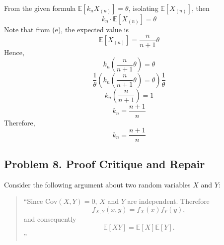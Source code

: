 \documentclass[letterpaper,12pt]{article}
\begin{document}
\begin{enumerate}[(a)]
\begin{list}{}{}
        From the given formula $\mathbb{E}[k_n X_{(n)}] = \theta$, isolating $\mathbb{E}[X_{(n)}]$, then
        \[        k_n \cdot \mathbb{E}[X_{(n)}] = \theta        \]
        Note that from (e), the expected value is
        \[        \mathbb{E}[X_{(n)}] = \frac{n}{n+1} \theta        \]
       Hence,
        \[
        k_n \left( \frac{n}{n+1} \theta \right) = \theta        \]
        \[        \frac{1}{\theta} \left( k_n \left( \frac{n}{n+1} \theta \right) = \theta \right) \frac{1}{\theta}
        \]
        \[        k_n \left( \frac{n}{n+1} \right) = 1        \]
        \[        \boxed{k_n = \frac{n+1}{n}}        \]
        Therefore,
        \[        k_n = \frac{n+1}{n}        \]
    \end{list}
\end{enumerate}

\vspace{1.5em}

\subsection*{Problem 8. Proof Critique and Repair \hfill \mdseries[6 points]}

Consider the following argument about two random variables $X$ and $Y$:

\begin{quote}
``Since $\text{Cov}(X, Y) = 0$, $X$ and $Y$ are independent. Therefore
\[f_{X,Y}(x, y) = f_X(x) f_Y(y),\]
and consequently
\[\mathbb{E}[XY] = \mathbb{E}[X] \mathbb{E}[Y].\]
''
\end{quote}
\end{document}

